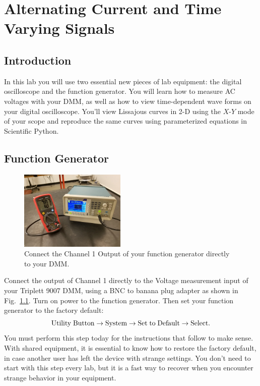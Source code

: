 \chapter{Alternating Current and Time Varying Signals}

\section{Introduction}

In this lab you will use two essential new pieces of lab equipment:
the digital oscilloscope and the function generator.  You will learn
how to measure AC voltages with your DMM, as well as how to view
time-dependent wave forms on your digital oscilloscope.  You'll view
Lissajous curves in 2-D using the $X$-$Y$ mode of your scope and
reproduce the same curves using parameterized equations in Scientific
Python.

\section{Function Generator}

\begin{figure}[htbp]
\begin{center}
\includegraphics[width=0.45\textwidth]{figs/labs/lissajous/generator_dmm_setup.jpg} 
\caption{Connect the Channel 1 Output of your function generator directly to your DMM.}
\label{fig:dmm_setup}
\end{center}
\end{figure}

Connect the output of Channel 1 directly to the Voltage measurement
input of your Triplett 9007 DMM, using a BNC to banana plug adapter as
shown in Fig.~\ref{fig:dmm_setup}.  Turn on power to the function
generator.  Then set your function generator to the factory default:
\begin{displaymath}
\rm Utility\;Button \to System \to Set\;to\;Default \to Select.
\end{displaymath}
You must perform this step today for the instructions that follow to
make sense.  With shared equipment, it is essential to know how to
restore the factory default, in case another user has left the device
with strange settings.  You don't need to start with this step every
lab, but it is a fast way to recover when you encounter strange
behavior in your equipment.

